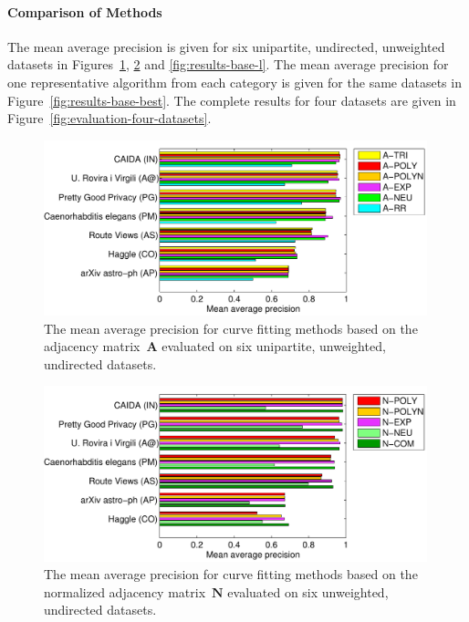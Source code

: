 \documentclass[11pt,a4paper]{book}
\newcommand{\wFull}{0.99}
\begin{document}
\paragraph{Comparison of Methods}
The mean average precision is given for six unipartite, undirected,
unweighted datasets in Figures~\ref{fig:results-base-a},
\ref{fig:results-base-n} and \ref{fig:results-base-l}.  
The mean average precision for one representative algorithm from each
category is given for the same datasets in
Figure~\ref{fig:results-base-best}. 
The complete results for four datasets are given in
Figure~\ref{fig:evaluation-four-datasets}. 

\begin{figure}[h!]
  \centering
  \includegraphics[width=\wFull\textwidth]{img-eps/resultsbar-base_a}
  \caption{
    The mean average precision for curve fitting methods based on the
    adjacency matrix~$\mathbf A$ evaluated on six unipartite,
    unweighted, undirected datasets. 
  }
  \label{fig:results-base-a}
\end{figure}

\begin{figure}[h!]
  \centering
  \includegraphics[width=\wFull\textwidth]{img-eps/resultsbar-base_n}
  \caption{
    The mean average precision for curve fitting methods based on the
    normalized adjacency matrix~$\mathbf N$ evaluated on six unweighted, undirected
    datasets. 
  }
  \label{fig:results-base-n}
\end{figure}
\end{document}
